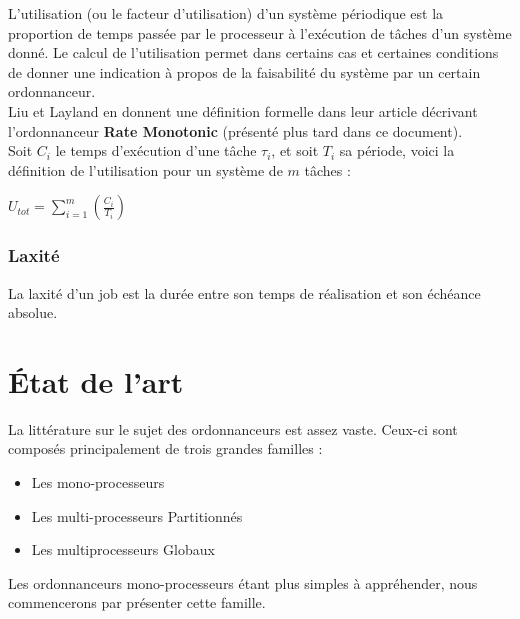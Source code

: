 \documentclass[11pt,a4paper,oneside]{report}
\begin{document}
L'utilisation (ou le facteur d'utilisation) d'un système périodique est la proportion de temps 
passée par le processeur à l'exécution de tâches d'un système donné. 
Le calcul de l'utilisation permet dans certains cas et certaines conditions de donner une indication 
à propos de la faisabilité du système par un certain ordonnanceur. 
\\

Liu et Layland \cite{liu_scheduling_1973} en donnent une définition formelle dans leur article décrivant l'ordonnanceur \textbf{Rate Monotonic} (présenté plus tard dans ce document).\\ 

Soit $C_i$ le temps d'exécution d'une tâche $\tau_i$, et soit $T_i$ sa période, voici la définition de 
l'utilisation pour un système de $m$ tâches :\\
\begin{center}
	$U_{tot} = \sum_{i = 1}^{m}(\frac{C_i}{T_i})$
\end{center}

\subsection{Laxité}
La laxité d'un job est la durée entre son temps de réalisation et son échéance absolue. 




\chapter{État de l'art}

La littérature sur le sujet des ordonnanceurs est assez vaste. 
Ceux-ci sont composés principalement de trois grandes familles :\\
\begin{itemize}
	\item Les mono-processeurs
	\item Les multi-processeurs Partitionnés
	\item Les multiprocesseurs Globaux
\end{itemize}
Les ordonnanceurs mono-processeurs étant plus simples à appréhender, nous commencerons 
par présenter cette famille.
\end{document}
